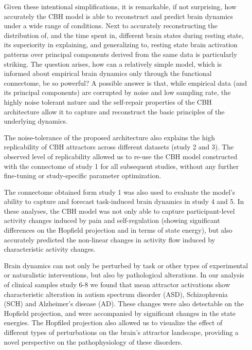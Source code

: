 \documentclass{article}
\begin{document}
Given these intentional simplifications, it is remarkable, if not surprising, how accurately the CBH model is able to reconstruct and predict brain dynamics under a wide range of conditions. Next to accurately reconstructing the distribution of, and the time spent in, different brain states during resting state, its superiority in explaining, and generalizing to, resting state brain activation patterns over principal components derived from the same data is particularly striking.
The question arises, how can a relatively simple model, which is informed about empirical brain dynamics only through the functional connectome, be so powerful?
A possible answer is that, while empirical data (and its principal components) are corrupted by noise and low sampling rate,
the highly noise tolerant nature and the self-repair properties of the CBH architecture allow it to capture and reconstruct the basic principles of the underlying dynamics.

The noise-tolerance of the proposed architecture also explains the high replicability of CBH attractors across different datasets (study 2 and 3).
The observed level of replicability allowed us to re-use the CBH model constructed with the connectome of study 1 for all subsequent studies, without any further fine-tuning or study-specific parameter optimization.

The connectome obtained form study 1 was also used to evaluate the model's ability to capture and forecast task-induced brain dynamics in study 4 and 5. In these analyses, the CBH model was not only able to capture participant-level activity changes induced by pain and self-regulation (showing significant differences on the Hopfield projection and in terms of state energy), but also accurately predicted the non-linear changes in activity flow induced by characteristic activity changes.

Brain dynamics can not only be perturbed by task or other types of experimental or naturalistic interventions, but also by pathological alterations.
In our analysis of clinical samples study 6-8 we found that mean attractor activations show characteristic alteration in autism spectrum disorder (ASD), Schizophrenia (SCH) and Alzheimer's disease (AD). These changes were also detectable on the Hopfield projection, and were accompanied by significant changes in the state energies.
The Hopfiled projection also allowed us to visualize the effect of different types of perturbations on the brain's attractor landscape, providing a novel perspective on the pathophysiology of these disorders.
\end{document}
